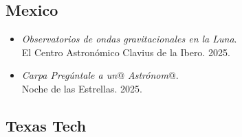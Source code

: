 \documentclass[letterpaper,10pt]{article}
\begin{document}
\subsection*{Mexico}

\begin{itemize}[label=$\blacktriangleright$]

	\item \textit{Observatorios de ondas gravitacionales en la Luna}. \\
    El Centro Astron\'omico Clavius de la Ibero. 2025. \\

	\item \textit{Carpa Preg\'untale a un$@$ Astr\'onom$@$}. \\
    Noche de las Estrellas. 2025. \\


\end{itemize}


\subsection*{Texas Tech}
\end{document}
